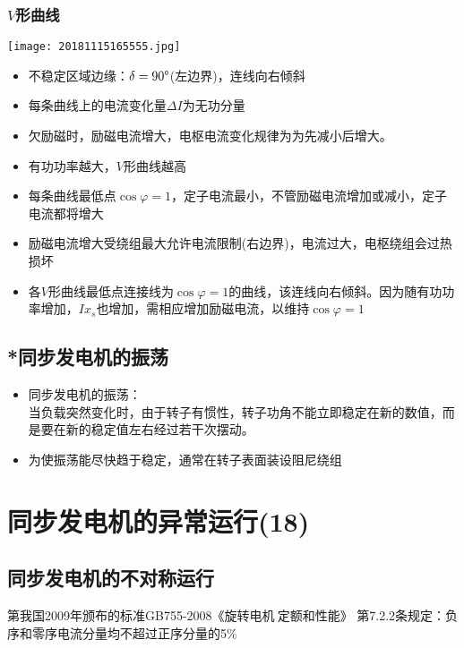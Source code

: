 \documentclass[blue]{elegantnote}
\begin{document}
\subsection{$V$形曲线}
	\begin{center}
		\texttt{[image: 20181115165555.jpg]}
	\end{center}
\begin{itemize}
	\item 不稳定区域边缘：$\delta=90\degree$(左边界)，连线向右倾斜
	\item	每条曲线上的电流变化量$\Delta I$为无功分量
	\item 	欠励磁时，励磁电流增大，电枢电流变化规律为为先减小后增大。
	\item 有功功率越大，$V$形曲线越高
	\item	每条曲线最低点$\cos\varphi=1$，定子电流最小，不管励磁电流增加或减小，定子电流都将增大
	\item	励磁电流增大受绕组最大允许电流限制(右边界)，电流过大，电枢绕组会过热损坏
	\item	各$V$形曲线最低点连接线为$\cos\varphi=1$的曲线，该连线向右倾斜。{\color{blue}因为随有功功率增加，$Ix_s$也增加，需相应增加励磁电流，以维持$\cos\varphi=1$}
\end{itemize}
\section{*同步发电机的振荡}
\begin{itemize}
	\item 同步发电机的振荡：\\
	当负载突然变化时，由于转子有惯性，转子功角不能立即稳定在新的数值，而是要在新的稳定值左右经过若干次摆动。
	\item 为使振荡能尽快趋于稳定，通常在转子表面装设{\color{blue}阻尼绕组}
\end{itemize}


\chapter{同步发电机的异常运行(18)}
\section{同步发电机的不对称运行}
第我国2009年颁布的标准GB755-2008《旋转电机$\ $定额和性能》
第7.2.2条规定：负序和零序电流分量均不超过正序分量的5\%
\end{document}

